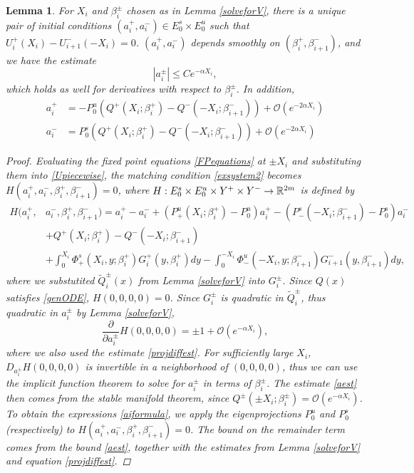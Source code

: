 \documentclass[10pt,reqno]{amsart}
\theoremstyle{plain}
\newtheorem{lemma}[theorem]{Lemma}
\theoremstyle{definition}
\theoremstyle{remark}
\numberwithin{theorem}{section}
\numberwithin{equation}{section}
\begin{document}
\begin{lemma}\label{solvefora}
For $X_i$ and $\beta_i^\pm$ chosen as in Lemma \ref{solveforV}, there is a unique pair of initial conditions $(a_i^+, a_i^-) \in E_0^s \times E_0^u$ such that $U_i^+(X_i) - U_{i+1}^-(-X_i) = 0$. $(a_i^+, a_i^-)$ depends smoothly on $(\beta_i^+, \beta_{i+1}^-)$, and we have the estimate
\begin{equation}\label{aest}
|a_i^\pm| \leq C e^{-\alpha X_i},
\end{equation}
which holds as well for derivatives with respect to $\beta_i^\pm$. In addition,
\begin{equation}\label{aiformula}
\begin{aligned}
a_i^+ &= -P^u_0 \left( Q^+(X_i; \beta_i^+) - Q^-(-X_i; \beta_{i+1}^-) \right) + \mathcal{O}( e^{-2 \alpha X_i} ) \\
a_i^- &= P^s_0 \left( Q^+(X_i; \beta_i^+) - Q^-(-X_i; \beta_{i+1}^-) \right) + \mathcal{O}\left( e^{-2 \alpha X_i} \right)
\end{aligned}
\end{equation}

\begin{proof}
Evaluating the fixed point equations \cref{FPequations} at $\pm X_i$ and substituting them into \cref{Upiecewise}, the matching condition \cref{exsystem2} becomes $H(a_i^+, a_i^-, \beta_i^+, \beta_{i+1}^-) = 0$, where $H: E_0^s \times E_0^u \times Y^+ \times Y^- \rightarrow \mathbb{R}^{2m}$ is defined by
\begin{align*}
H(a_i^+, &a_i^-, \beta_i^+, \beta_{i+1}^-) 
= a_i^+ - a_i^- + (P^u_+(X_i; \beta_i^+) -  P^u_0)a_i^+ - (P^s_-(-X_i; \beta_{i+1}^-) - P^s_0) a_i^-  \\
&+ Q^+(X_i; \beta_i^+) - Q^-(-X_i; \beta_{i+1}^-)\\
&+ \int_0^{X_i} \Phi_+^s(X_i, y; \beta_i^+) G_i^+(y,\beta_i^+)dy
- \int_0^{-X_i} \Phi_-^u(-X_i, y; \beta_{i+1}^-) G_{i+1}^-(y,\beta_{i+1}^-)dy,
\end{align*}
where we substutited $\tilde{Q}_i^\pm(x)$ from Lemma \ref{solveforV} into $G_i^\pm$. Since $Q(x)$ satisfies \eqref{genODE}, $H(0, 0, 0, 0) = 0$. Since $G_i^\pm$ is quadratic in $\tilde{Q}_i^\pm$, thus quadratic in $a_i^\pm$ by Lemma \ref{solveforV},
\[
\frac{\partial}{\partial a_i^\pm} H(0, 0, 0, 0) = \pm 1 + \mathcal{O} (e^{-\alpha X_i}),
\]
where we also used the estimate \cref{projdiffest}. For sufficiently large $X_i$, $D_{a_i^\pm} H(0, 0, 0, 0)$ is invertible in a neighborhood of $(0, 0, 0, 0)$, thus we can use the implicit function theorem to solve for $a_i^\pm$ in terms of $\beta_i^\pm$. The estimate \cref{aest} then comes from the stable manifold theorem, since $Q^\pm(\pm X_i; \beta_i^\pm) = \mathcal{O}(e^{-\alpha X_i})$. To obtain the expressions \cref{aiformula}, we apply the eigenprojections $P^u_0$ and $P^s_0$ (respectively) to $H(a_i^+, a_i^-, \beta_i^+, \beta_{i+1}^-) = 0$. The bound on the remainder term comes from the bound \cref{aest}, together with the estimates from Lemma \ref{solveforV} and equation \cref{projdiffest}. 
\end{proof}
\end{lemma}
\end{document}
